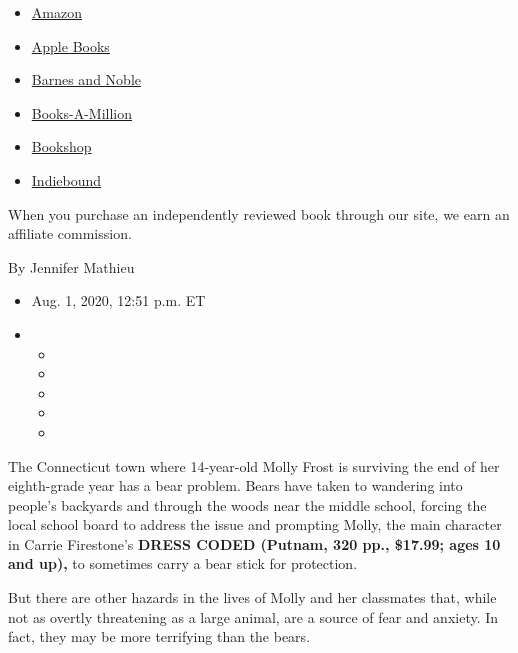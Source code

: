 \begin{itemize}
\tightlist
\item
  \href{https://www.amazon.com/gp/search?index=books\&tag=NYTBSREV-20\&field-keywords=Dress+Coded+Carrie+Firestone}{Amazon}
\item
  \href{https://du-gae-books-dot-nyt-du-prd.appspot.com/buy?title=Dress+Coded\&author=Carrie+Firestone}{Apple
  Books}
\item
  \href{https://www.anrdoezrs.net/click-7990613-11819508?url=https\%3A\%2F\%2Fwww.barnesandnoble.com\%2Fw\%2F\%3Fean\%3D9781984816436}{Barnes
  and Noble}
\item
  \href{https://www.anrdoezrs.net/click-7990613-35140?url=https\%3A\%2F\%2Fwww.booksamillion.com\%2Fp\%2FDress\%2BCoded\%2FCarrie\%2BFirestone\%2F9781984816436}{Books-A-Million}
\item
  \href{https://bookshop.org/a/3546/9781984816436}{Bookshop}
\item
  \href{https://www.indiebound.org/book/9781984816436?aff=NYT}{Indiebound}
\end{itemize}

When you purchase an independently reviewed book through our site, we
earn an affiliate commission.

By Jennifer Mathieu

\begin{itemize}
\item
  Aug. 1, 2020, 12:51 p.m. ET
\item
  \begin{itemize}
  \item
  \item
  \item
  \item
  \item
  \end{itemize}
\end{itemize}

The Connecticut town where 14-year-old Molly Frost is surviving the end
of her eighth-grade year has a bear problem. Bears have taken to
wandering into people's backyards and through the woods near the middle
school, forcing the local school board to address the issue and
prompting Molly, the main character in Carrie Firestone's \textbf{DRESS
CODED (Putnam, 320 pp., \$17.99; ages 10 and up),} to sometimes carry a
bear stick for protection.

But there are other hazards in the lives of Molly and her classmates
that, while not as overtly threatening as a large animal, are a source
of fear and anxiety. In fact, they may be more terrifying than the
bears.

